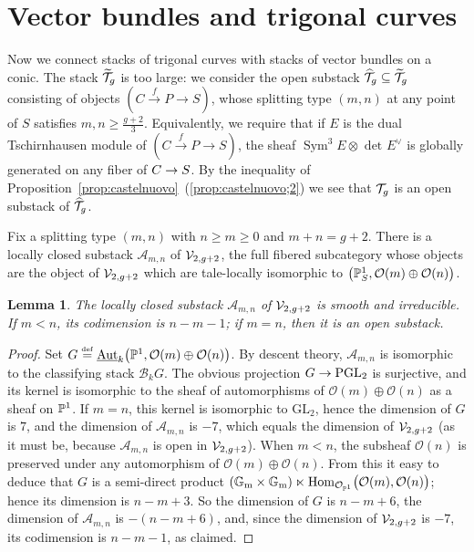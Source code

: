 \documentclass{amsart}
\numberwithin{equation}{section}
\numberwithin{subsection}{section}
\newtheorem{lemma}[theorem]{Lemma}
\theoremstyle{definition}
\theoremstyle{remark}
\newcommand\refall[2]{\ref{#1}~(\ref{#1;#2})}
\newcommand\cA{\mathcal{A}} \newcommand\cB{\mathcal{B}}
\newcommand\cO{\mathcal{O}} \newcommand\cP{\mathcal{P}}
\newcommand\arr{\ifinner\to\else\longrightarrow\fi}
\newcommand{\xarr}{\xrightarrow}
\newcommand\eqdef{\overset{\mathrm{\scriptscriptstyle def}} =}
\renewcommand\hom{\operatorname{Hom}}
\newcommand{\underaut}
{\mathop{\underline{\mathrm{Aut}}}\nolimits}
\newcommand{\T}[1][g]{\cT_{#1}}
\newcommand{\Tbig}[1][g]{\widetilde{\cT}_{#1}}
\newcommand{\OT}[1][g]{\widehat{\cT}_{#1}}
\newcommand{\tsch}{Tschirnhausen\xspace}
\newcommand{\GL}{\mathrm{GL}}
\newcommand{\PGL}{\mathrm{PGL}}
\newcommand{\gm}{\mathbb{G}_{\mathrm{m}}}
\newcommand{\sym}{\operatorname{Sym}}
\newcommand{\symthree}[2][]{\sym^{3}_{{#1}}{#2} \otimes_{{#1}} \det\nolimits_{{#1}} {#2}\dual}
\newcommand{\dual}{^{\vee}}
\begin{document}
\section{Vector bundles and trigonal curves}\label{sectrigo}

Now we connect stacks of trigonal curves with stacks of vector bundles on a conic. The stack $\Tbig$ is too large: we consider the open substack $\OT \subseteq \Tbig$ consisting of objects $(C \xarr{f} P \to S)$, whose splitting type $(m,n)$ at any point of $S$ satisfies $m, n \geq \frac{g+2}{3}$. Equivalently, we require that if $E$ is the dual \tsch module of $(C \xarr{f} P \to S)$, the sheaf $\symthree E$ is globally generated on any fiber of $C \arr S$. By the inequality of Proposition~\refall{prop:castelnuovo}{2} we see that $\T$ is an open substack of $\OT$.

Fix a splitting type $(m,n)$ with $n \geq m \geq 0$ and $m + n = g+2$. There is a locally closed substack $\cA_{m,n}$ of $\mathcal{V}_{2, g+2}$, the full fibered subcategory whose objects are the object of $\mathcal{V}_{2,g+2}$ which are tale-locally isomorphic to $\bigl(\PP^{1}_{S}, \cO(m)\oplus\cO(n)\bigr)$. 

\begin{lemma}\label{lem:codimension}
The locally closed substack $\cA_{m,n}$ of $\mathcal{V}_{2, g+2}$ is smooth and irreducible. If $m < n$, its codimension is $n - m - 1$; if $m = n$, then it is an open substack.
\end{lemma}

\begin{proof}
Set $G \eqdef \underaut_{k}\bigl(\PP^{1}, \cO(m) \oplus \cO(n)\bigr)$. By descent theory, $\cA_{m,n}$ is isomorphic to the classifying stack $\cB_{k}G$. The obvious projection $G \arr \PGL_{2}$ is surjective, and its kernel is isomorphic to the sheaf of automorphisms of $\cO(m) \oplus \cO(n)$ as a sheaf on $\mathbb{P}^{1}$. If $m = n$, this kernel is isomorphic to $\GL_{2}$, hence the dimension of $G$ is $7$, and the dimension of $\cA_{m,n}$ is $-7$, which equals the dimension of $\mathcal{V}_{2,g+2}$ (as it must be, because $\cA_{m,n}$ is open in $\mathcal{V}_{2,g+2}$). When $m < n$, the subsheaf $\cO(n)$ is preserved under any automorphism of $\cO(m) \oplus \cO(n)$. From this it easy to deduce that $G$ is a semi-direct product $(\gm\times\gm) \ltimes \hom_{\cO_{\PP^{1}}}\bigl(\cO(m), \cO(n)\bigr)$; hence its dimension is $n-m+3$. So the dimension of $G$ is $n - m + 6$, the dimension of $\cA_{m,n}$ is $-(n-m+6)$, and, since the dimension of $\mathcal{V}_{2,g+2}$ is $-7$, its codimension is $n - m - 1$, as claimed.
\end{proof}
\end{document}
